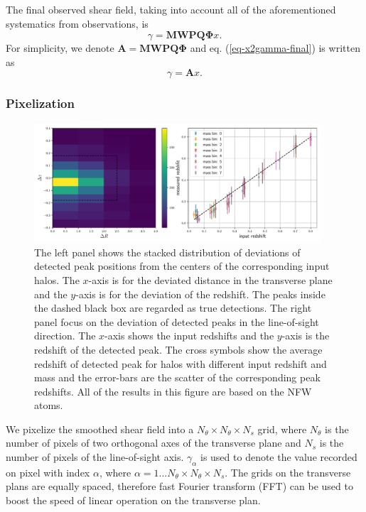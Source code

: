 \documentclass[twocolumn]{aastex62}
\begin{document}
The final observed shear field, taking into account all of the aforementioned systematics from observations,
is
\begin{equation}\label{eq-x2gamma-final}
\gamma =\mathbf{M} \mathbf{W} \mathbf{P} \mathbf{Q} \mathbf{\Phi} x.
\end{equation}
For simplicity, we denote $\mathbf{A}=\mathbf{M} \mathbf{W} \mathbf{P} \mathbf{Q} \mathbf{\Phi} $ and
eq. (\ref{eq-x2gamma-final}) is written as
\begin{equation}\label{eq-x2gamma-simple}
\gamma=\mathbf{A} x.
\end{equation}


\subsubsection{Pixelization}
\label{subsec:method-pixel}

\begin{figure}[!t]
 \centering
 \includegraphics[width=0.95\textwidth]{peak_scatters_f3-1.pdf}
 \caption{The left panel shows the stacked distribution of deviations of detected peak positions 
 from the centers of the corresponding input halos. The $x$-axis is for the deviated distance in the transverse plane and the 
 $y$-axis is for the deviation of the redshift. The peaks inside the dashed black box are regarded as true detections. The 
 right panel focus on the deviation of detected peaks in the line-of-sight direction. The $x$-axis shows the input redshifts 
 and the $y$-axis is the redshift of the detected peak. The cross symbols show the average redshift of detected peak for 
 halos with different input redshift and mass and the error-bars are the scatter of the corresponding peak redshifts. All 
 of the results in this figure are based on the NFW atoms.}
\end{figure}

We pixelize the smoothed shear field into a $N_\theta \times N_\theta \times N_s$ grid, where $N_\theta$
is the number of pixels of two orthogonal axes of the transverse plane and $N_s$ is the number of pixels of the
line-of-sight axis. $\gamma_{\alpha}$ is used to denote the value recorded on pixel with index $\alpha$, where $\alpha=
1...N_\theta \times N_\theta \times N_s$. The grids on the transverse plans are equally spaced, therefore fast Fourier
transform (FFT) can be used to boost the speed of linear operation on the transverse plan.
\end{document}

